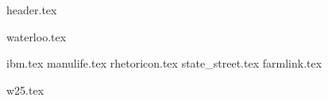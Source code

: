 \documentclass[11pt]{article}
\begin{document}
{header.tex}

{waterloo.tex}

{ibm.tex}
{manulife.tex}
{rhetoricon.tex}
{state_street.tex}
{farmlink.tex}

{w25.tex}


\end{document}
